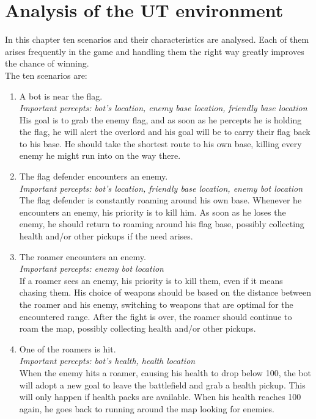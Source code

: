 \chapter{Analysis of the UT environment}
In this chapter ten scenarios and their characteristics are analysed. Each of them arises frequently in the game and handling them the right way greatly improves the chance of winning.\\
The ten scenarios are:
\begin{enumerate}
	\item A bot is near the flag. \\
	\textit{Important percepts: bot's location, enemy base location, friendly base location} \\
	His goal is to grab the enemy flag, and as soon as he percepts he is holding the flag, he will alert the overlord and his goal will be to carry their flag back to his base. He should take the shortest route to his own base, killing every enemy he might run into on the way there.\\
	\item The flag defender encounters an enemy. \\
	\textit{Important percepts: bot's location, friendly base location, enemy bot location} \\
	The flag defender is constantly roaming around his own base. Whenever he encounters an enemy, his priority is to kill him. As soon as he loses the enemy, he should return to roaming around his flag base, possibly collecting health and/or other pickups if the need arises.\\
	\item The roamer encounters an enemy. \\
	\textit{Important percepts: enemy bot location} \\
	If a roamer sees an enemy, his priority is to kill them, even if it means chasing them. His choice of weapons should be based on the distance between the roamer and his enemy, switching to weapons that are optimal for the encountered range. After the fight is over, the roamer should continue to roam the map, possibly collecting health and/or other pickups. \\
	\item One of the roamers is hit. \\
	\textit{Important percepts: bot's health, health location} \\
	When the enemy hits a roamer, causing his health to drop below 100, the bot will adopt a new goal to leave the battlefield and grab a health pickup. This will only happen if health packs are available. When his health reaches 100 again, he goes back to running around the map looking for enemies.\\

\end{enumerate}
